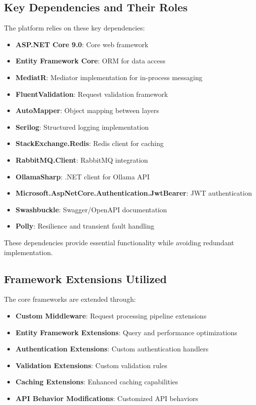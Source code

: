\subsection{Key Dependencies and Their Roles}
The platform relies on these key dependencies:
\begin{itemize}
    \item \textbf{ASP.NET Core 9.0}: Core web framework
    \item \textbf{Entity Framework Core}: ORM for data access
    \item \textbf{MediatR}: Mediator implementation for in-process messaging
    \item \textbf{FluentValidation}: Request validation framework
    \item \textbf{AutoMapper}: Object mapping between layers
    \item \textbf{Serilog}: Structured logging implementation
    \item \textbf{StackExchange.Redis}: Redis client for caching
    \item \textbf{RabbitMQ.Client}: RabbitMQ integration
    \item \textbf{OllamaSharp}: .NET client for Ollama API
    \item \textbf{Microsoft.AspNetCore.Authentication.JwtBearer}: JWT authentication
    \item \textbf{Swashbuckle}: Swagger/OpenAPI documentation
    \item \textbf{Polly}: Resilience and transient fault handling
\end{itemize}

These dependencies provide essential functionality while avoiding redundant implementation.

\subsection{Framework Extensions Utilized}
The core frameworks are extended through:
\begin{itemize}
    \item \textbf{Custom Middleware}: Request processing pipeline extensions
    \item \textbf{Entity Framework Extensions}: Query and performance optimizations
    \item \textbf{Authentication Extensions}: Custom authentication handlers
    \item \textbf{Validation Extensions}: Custom validation rules
    \item \textbf{Caching Extensions}: Enhanced caching capabilities
    \item \textbf{API Behavior Modifications}: Customized API behaviors
\end{itemize}

